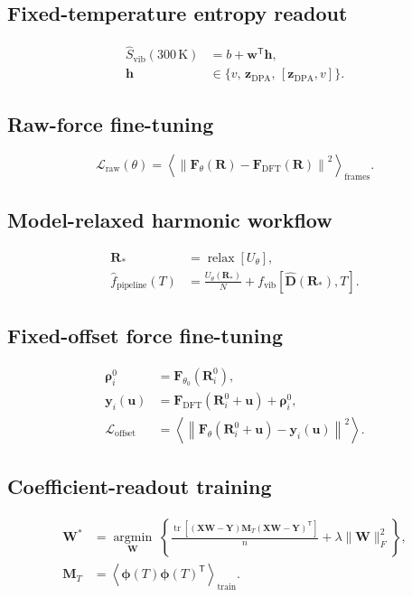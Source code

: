 \documentclass{article}
\begin{document}
\subsection*{Fixed-temperature entropy readout}
\[\begin{aligned}\widehat S_{\mathrm{vib}}(300\,\mathrm K)&=b+\mathbf w^{\mathsf T}\mathbf h,\\\mathbf h&\in\{v,\,\mathbf z_{\mathrm{DPA}},\,[\mathbf z_{\mathrm{DPA}},v]\}.\end{aligned}\]
\subsection*{Raw-force fine-tuning}
\[\mathcal L_{\mathrm{raw}}(\theta)=\left\langle\left\lVert\mathbf F_\theta(\mathbf R)-\mathbf F_{\mathrm{DFT}}(\mathbf R)\right\rVert^2\right\rangle_{\mathrm{frames}}.\]
\subsection*{Model-relaxed harmonic workflow}
\[\begin{aligned}\mathbf R_*&=\operatorname{relax}[U_\theta],\\\widehat f_{\mathrm{pipeline}}(T)&=\frac{U_\theta(\mathbf R_*)}{N}+f_{\mathrm{vib}}\!\left[\widehat{\mathbf D}(\mathbf R_*),T\right].\end{aligned}\]
\subsection*{Fixed-offset force fine-tuning}
\[\begin{aligned}\boldsymbol\rho_i^0&=\mathbf F_{\theta_0}(\mathbf R_i^0),\\\mathbf y_i(\mathbf u)&=\mathbf F_{\mathrm{DFT}}(\mathbf R_i^0+\mathbf u)+\boldsymbol\rho_i^0,\\\mathcal L_{\mathrm{offset}}&=\left\langle\left\lVert\mathbf F_\theta(\mathbf R_i^0+\mathbf u)-\mathbf y_i(\mathbf u)\right\rVert^2\right\rangle.\end{aligned}\]
\subsection*{Coefficient-readout training}
\[\begin{aligned}\mathbf W^*&=\underset{\mathbf W}{\operatorname{argmin}}\;\left\{\frac{\operatorname{tr}\!\left[(\mathbf X\mathbf W-\mathbf Y)\mathbf M_T(\mathbf X\mathbf W-\mathbf Y)^{\mathsf T}\right]}{n}+\lambda\lVert\mathbf W\rVert_F^2\right\},\\\mathbf M_T&=\left\langle\boldsymbol\phi(T)\boldsymbol\phi(T)^{\mathsf T}\right\rangle_{\mathrm{train}}.\end{aligned}\]
\end{document}
